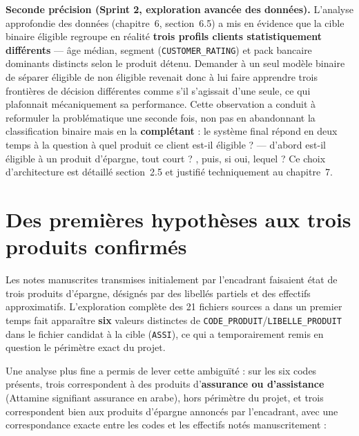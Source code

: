 \documentclass[11pt,a4paper]{report}
\begin{document}
\textbf{Seconde précision (Sprint 2, exploration avancée des données).}
L'analyse approfondie des données (chapitre~6, section~6.5) a mis en
évidence que la cible binaire \og éligible \fg{} regroupe en réalité
\textbf{trois profils clients statistiquement différents} — âge médian,
segment (\texttt{CUSTOMER\_RATING}) et pack bancaire dominants distincts
selon le produit détenu. Demander à un seul modèle binaire de séparer
\og éligible \fg{} de \og non éligible \fg{} revenait donc à lui faire
apprendre trois frontières de décision différentes comme s'il s'agissait
d'une seule, ce qui plafonnait mécaniquement sa performance. Cette
observation a conduit à reformuler la problématique une seconde fois,
non pas en abandonnant la classification binaire mais en la
\textbf{complétant} : le système final répond en deux temps à la question
\og à quel produit ce client est-il éligible ? \fg{} — d'abord
\og est-il éligible à un produit d'épargne, tout court ? \fg{}, puis, si
oui, \og lequel ? \fg{} Ce choix d'architecture est détaillé section~2.5 et
justifié techniquement au chapitre~7.

\section{Des premières hypothèses aux trois produits confirmés}
Les notes manuscrites transmises initialement par l'encadrant faisaient
état de trois produits d'épargne, désignés par des libellés partiels et des
effectifs approximatifs. L'exploration complète des 21 fichiers sources a
dans un premier temps fait apparaître \textbf{six} valeurs distinctes de
\texttt{CODE\_PRODUIT}/\texttt{LIBELLE\_PRODUIT} dans le fichier candidat à
la cible (\texttt{ASSI}), ce qui a temporairement remis en question le
périmètre exact du projet.

Une analyse plus fine a permis de lever cette ambiguïté : sur les six
codes présents, trois correspondent à des produits d'\textbf{assurance ou
d'assistance} (\og Attamine \fg{} signifiant \og assurance \fg{} en arabe),
hors périmètre du projet, et trois correspondent bien aux produits
d'épargne annoncés par l'encadrant, avec une correspondance exacte entre
les codes et les effectifs notés manuscritement :
\end{document}
